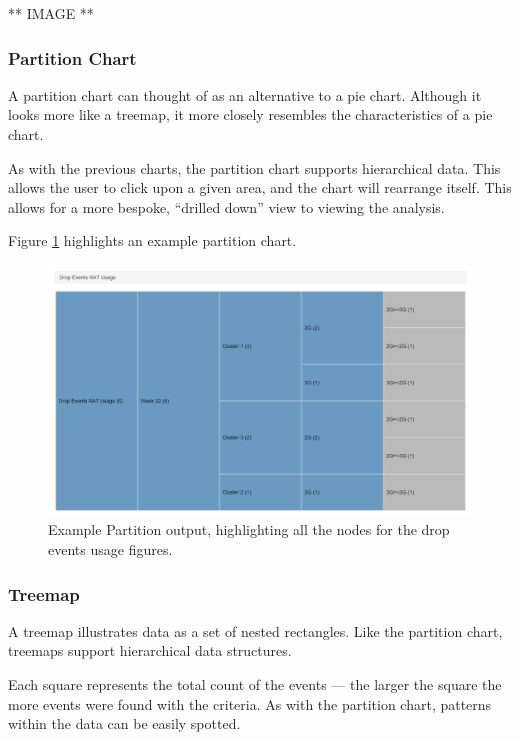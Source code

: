 ** IMAGE **



\newpage
\subsubsection{Partition Chart}
A partition chart can thought of as an alternative to a pie chart. Although it 
looks more like a treemap, it more closely resembles the characteristics of a 
pie chart.

As with the previous charts, the partition chart supports hierarchical data. 
This allows the user to click upon a given area, and the chart will rearrange 
itself. This allows for a more bespoke, ``drilled down'' view to viewing the 
analysis.

Figure \ref{fig:partition_chart} highlights an example partition chart.

\begin{figure}[H]
  \centering
    \includegraphics[scale=0.55]{chapter8/visualisation/partition.png}
    \caption[Example Partition output]
            {Example Partition output, highlighting all the nodes for the drop 
             events usage figures.}
    \label{fig:partition_chart}
\end{figure}


\newpage
\subsubsection{Treemap}
A treemap illustrates data as a set of nested rectangles. Like the partition 
chart, treemaps support hierarchical data structures.

Each square represents the total count of the events --- the larger the square 
the more events were found with the criteria. As with the partition chart, 
patterns within the data can be easily spotted. 


